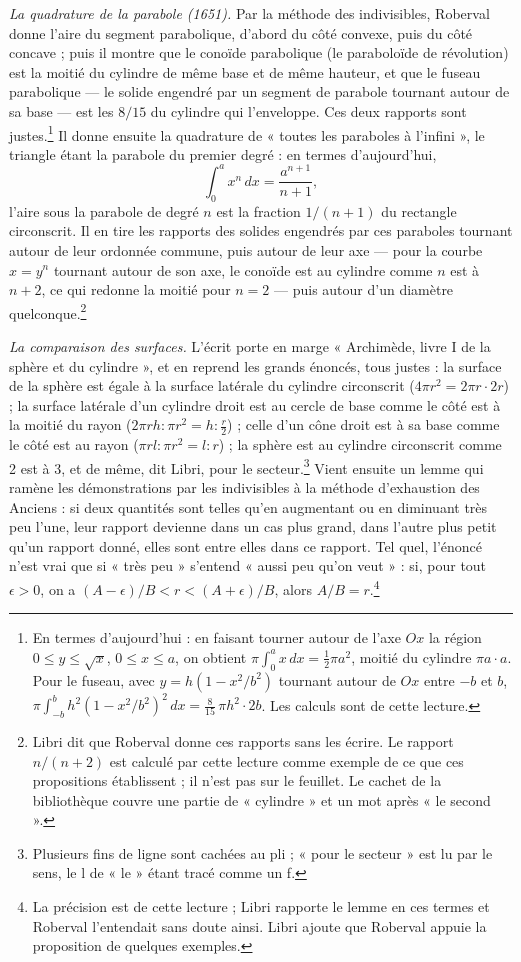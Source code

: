 \documentclass[11pt,a4paper]{article}
\begin{document}
\emph{La quadrature de la parabole (1651).} Par la méthode des indivisibles,
Roberval donne l'aire du segment parabolique, d'abord du côté convexe, puis
du côté concave ; puis il montre que le conoïde parabolique (le paraboloïde de
révolution) est la moitié du cylindre de même base et de même hauteur, et que
le fuseau parabolique — le solide engendré par un segment de parabole
tournant autour de sa base — est les $8/15$ du cylindre qui l'enveloppe. Ces
deux rapports sont justes.\footnote{En termes d'aujourd'hui : en faisant
tourner autour de l'axe $Ox$ la région $0 \le y \le \sqrt{x}$, $0 \le x \le
a$, on obtient $\pi \int_0^a x\,dx = \tfrac12 \pi a^2$, moitié du cylindre
$\pi a \cdot a$. Pour le fuseau, avec $y = h(1 - x^2/b^2)$ tournant autour de
$Ox$ entre $-b$ et $b$, $\pi \int_{-b}^{b} h^2 (1 - x^2/b^2)^2\,dx =
\tfrac{8}{15}\,\pi h^2 \cdot 2b$. Les calculs sont de cette lecture.} Il
donne ensuite la quadrature de « toutes les paraboles à l'infini », le
triangle étant la parabole du premier degré : en termes d'aujourd'hui,
\[
\int_0^a x^n\,dx = \frac{a^{n+1}}{n+1},
\]
l'aire sous la parabole de degré $n$ est la fraction $1/(n+1)$ du rectangle
circonscrit. Il en tire les rapports des solides engendrés par ces paraboles
tournant autour de leur ordonnée commune, puis autour de leur axe — pour la
courbe $x = y^n$ tournant autour de son axe, le conoïde est au cylindre comme
$n$ est à $n + 2$, ce qui redonne la moitié pour $n = 2$ — puis autour d'un
diamètre quelconque.\footnote{Libri dit que Roberval donne ces rapports sans
les écrire. Le rapport $n/(n+2)$ est calculé par cette lecture comme exemple
de ce que ces propositions établissent ; il n'est pas sur le feuillet. Le
cachet de la bibliothèque couvre une partie de « cylindre » et un mot après
« le second ».}

\emph{La comparaison des surfaces.} L'écrit porte en marge « Archimède, livre
I de la sphère et du cylindre », et en reprend les grands énoncés, tous justes :
la surface de la sphère est égale à la surface latérale du cylindre circonscrit
($4\pi r^2 = 2\pi r \cdot 2r$) ; la surface latérale d'un cylindre droit est
au cercle de base comme le côté est à la moitié du rayon ($2\pi r h : \pi r^2
= h : \tfrac{r}{2}$) ; celle d'un cône droit est à sa base comme le côté est
au rayon ($\pi r l : \pi r^2 = l : r$) ; la sphère est au cylindre circonscrit
comme 2 est à 3, et de même, dit Libri, pour le secteur.\footnote{Plusieurs
fins de ligne sont cachées au pli ; « pour le secteur » est lu par le sens, le
l de « le » étant tracé comme un f.} Vient ensuite un lemme qui ramène les
démonstrations par les indivisibles à la méthode d'exhaustion des Anciens :
si deux quantités sont telles qu'en augmentant ou en diminuant très peu l'une,
leur rapport devienne dans un cas plus grand, dans l'autre plus petit qu'un
rapport donné, elles sont entre elles dans ce rapport. Tel quel, l'énoncé
n'est vrai que si « très peu » s'entend « aussi peu qu'on veut » : si, pour
tout $\epsilon > 0$, on a $(A - \epsilon)/B < r < (A + \epsilon)/B$, alors
$A/B = r$.\footnote{La précision est de cette lecture ; Libri rapporte le
lemme en ces termes et Roberval l'entendait sans doute ainsi. Libri ajoute que
Roberval appuie la proposition de quelques exemples.}
\end{document}
